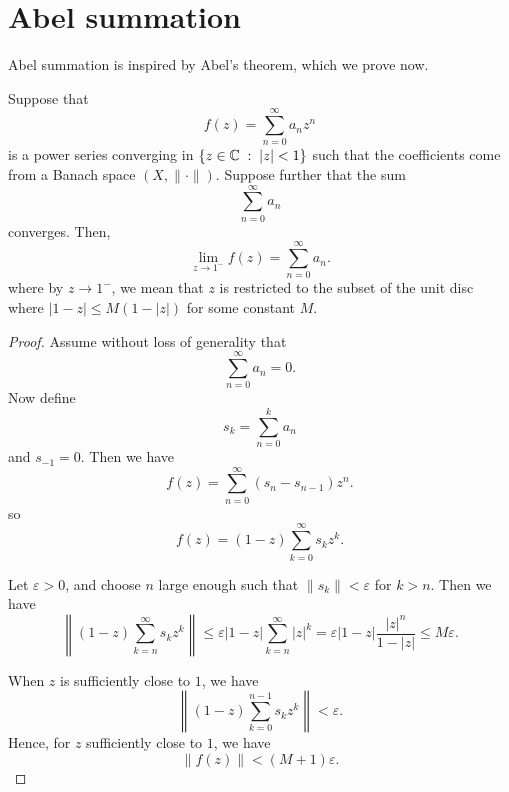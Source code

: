 \section{Abel summation}
Abel summation is inspired by Abel's theorem, which we prove now.
\begin{proposition}
    Suppose that
    \begin{equation*}
        f(z) = \sum_{n=0}^\infty a_n z^n
    \end{equation*}
    is a power series converging in $\{z \in \mathbb{C}\;:\;|z| < 1\}$
    such that the coefficients come from a Banach space $(X,\|\cdot\|)$. Suppose further that the sum
    \begin{equation*}
        \sum_{n=0}^\infty a_n
    \end{equation*}
    converges. Then,
    \begin{equation*}
        \lim_{z\rightarrow 1^-} f(z) = \sum_{n=0}^\infty a_n.
    \end{equation*}
    where by $z\rightarrow 1^-$, we mean that $z$ is restricted
    to the subset of the unit disc where $|1-z| \leq M(1-|z|)$
    for some constant $M$.
\end{proposition}
\begin{proof}
    Assume without loss of generality that 
    \begin{equation*}
        \sum_{n=0}^\infty a_n = 0.
    \end{equation*}
    Now define
    \begin{equation*}
        s_k = \sum_{n=0}^k a_n
    \end{equation*}
    and $s_{-1} = 0$.
    Then we have
    \begin{equation*}
        f(z) = \sum_{n=0}^\infty (s_n-s_{n-1})z^n.
    \end{equation*}
    so
    \begin{equation*}
        f(z) = (1-z)\sum_{k=0}^\infty s_k z^k.
    \end{equation*}
    
    Let $\varepsilon > 0$, and choose $n$ large enough such that $\|s_k\| < \varepsilon$
    for $k > n$. Then we have
    \begin{equation*}
        \left\|(1-z)\sum_{k=n}^\infty s_k z^k\right\| \leq \varepsilon|1-z|\sum_{k=n}^\infty |z|^k = \varepsilon|1-z| \frac{|z|^n}{1-|z|} \leq M \varepsilon.
    \end{equation*}
    
    When $z$ is sufficiently close to $1$, we have
    \begin{equation*}
        \left\|(1-z)\sum_{k=0}^{n-1} s_k z^k\right\| < \varepsilon.
    \end{equation*}
    Hence, for $z$ sufficiently close to $1$, we have
    \begin{equation*}
        \|f(z)\| < (M+1)\varepsilon.
    \end{equation*}
\end{proof}
